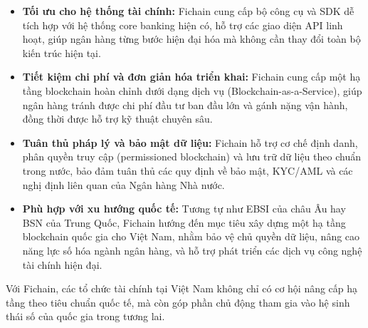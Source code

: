 \begin{itemize}
  \item \textbf{Tối ưu cho hệ thống tài chính:} Fichain cung cấp bộ công cụ và SDK dễ tích hợp với hệ thống core banking hiện có, hỗ trợ các giao diện API linh hoạt, giúp ngân hàng từng bước hiện đại hóa mà không cần thay đổi toàn bộ kiến trúc hiện tại.
  
  \item \textbf{Tiết kiệm chi phí và đơn giản hóa triển khai:} Fichain cung cấp một hạ tầng blockchain hoàn chỉnh dưới dạng dịch vụ (Blockchain-as-a-Service), giúp ngân hàng tránh được chi phí đầu tư ban đầu lớn và gánh nặng vận hành, đồng thời được hỗ trợ kỹ thuật chuyên sâu.
  
  \item \textbf{Tuân thủ pháp lý và bảo mật dữ liệu:} Fichain hỗ trợ cơ chế định danh, phân quyền truy cập (permissioned blockchain) và lưu trữ dữ liệu theo chuẩn trong nước, bảo đảm tuân thủ các quy định về bảo mật, KYC/AML và các nghị định liên quan của Ngân hàng Nhà nước.
  
  \item \textbf{Phù hợp với xu hướng quốc tế:} Tương tự như EBSI của châu Âu hay BSN của Trung Quốc, Fichain hướng đến mục tiêu xây dựng một hạ tầng blockchain quốc gia cho Việt Nam, nhằm bảo vệ chủ quyền dữ liệu, nâng cao năng lực số hóa ngành ngân hàng, và hỗ trợ phát triển các dịch vụ công nghệ tài chính hiện đại.
\end{itemize}

Với Fichain, các tổ chức tài chính tại Việt Nam không chỉ có cơ hội nâng cấp hạ tầng theo tiêu chuẩn quốc tế, mà còn góp phần chủ động tham gia vào hệ sinh thái số của quốc gia trong tương lai.

